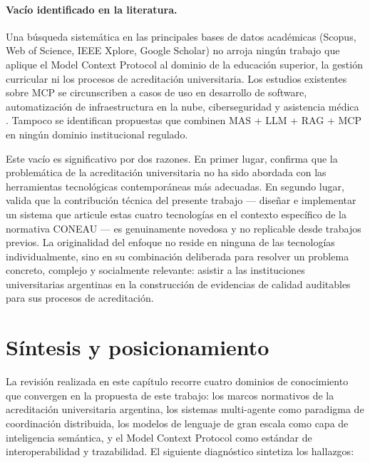 \paragraph{Vacío identificado en la literatura.}
Una búsqueda sistemática en las principales bases de datos académicas (Scopus, Web of Science, IEEE Xplore, Google Scholar) no arroja ningún trabajo que aplique el Model Context Protocol al dominio de la educación superior, la gestión curricular ni los procesos de acreditación universitaria. Los estudios existentes sobre MCP se circunscriben a casos de uso en desarrollo de software, automatización de infraestructura en la nube, ciberseguridad y asistencia médica \citep{ray2025survey, hou2025model}. Tampoco se identifican propuestas que combinen MAS + LLM + RAG + MCP en ningún dominio institucional regulado.

Este vacío es significativo por dos razones. En primer lugar, confirma que la problemática de la acreditación universitaria no ha sido abordada con las herramientas tecnológicas contemporáneas más adecuadas. En segundo lugar, valida que la contribución técnica del presente trabajo --- diseñar e implementar un sistema que articule estas cuatro tecnologías en el contexto específico de la normativa CONEAU --- es genuinamente novedosa y no replicable desde trabajos previos. La originalidad del enfoque no reside en ninguna de las tecnologías individualmente, sino en su combinación deliberada para resolver un problema concreto, complejo y socialmente relevante: asistir a las instituciones universitarias argentinas en la construcción de evidencias de calidad auditables para sus procesos de acreditación.

\section{Síntesis y posicionamiento}
\label{sec:eda_sintesis}

La revisión realizada en este capítulo recorre cuatro dominios de conocimiento que convergen en la propuesta de este trabajo: los marcos normativos de la acreditación universitaria argentina, los sistemas multi-agente como paradigma de coordinación distribuida, los modelos de lenguaje de gran escala como capa de inteligencia semántica, y el Model Context Protocol como estándar de interoperabilidad y trazabilidad. El siguiente diagnóstico sintetiza los hallazgos:

